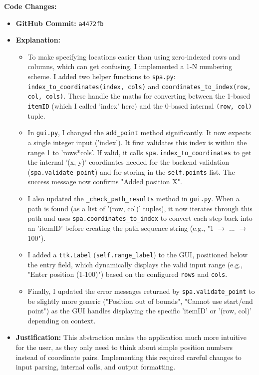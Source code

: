 \textbf{Code Changes:}
\begin{itemize}
	\item \textbf{GitHub Commit:} \verb|a4472fb|
	\item \textbf{Explanation:}
	\begin{itemize}
		\item To make specifying locations easier than using zero-indexed rows and columns, which can get confusing, I implemented a 1-N numbering scheme. I added two helper functions to \verb|spa.py|: \verb|index_to_coordinates(index, cols)| and \verb|coordinates_to_index(row, col, cols)|. These handle the maths for converting between the 1-based \verb|itemID| (which I called 'index' here) and the 0-based internal \verb|(row, col)| tuple.
		\item In \verb|gui.py|, I changed the \verb|add_point| method significantly. It now expects a single integer input ('index'). It first validates this index is within the range 1 to 'rows*cols'. If valid, it calls \verb|spa.index_to_coordinates| to get the internal '(x, y)' coordinates needed for the backend validation (\verb|spa.validate_point|) and for storing in the \verb|self.points| list. The success message now confirms "Added position X".
		\item I also updated the \verb|_check_path_results| method in \verb|gui.py|. When a path is found (as a list of '(row, col)' tuples), it now iterates through this path and uses \verb|spa.coordinates_to_index| to convert each step back into an 'itemID' before creating the path sequence string (e.g., "1 $ \rightarrow $ ... $ \rightarrow $ 100").
		\item I added a \verb|ttk.Label| (\verb|self.range_label|) to the GUI, positioned below the entry field, which dynamically displays the valid input range (e.g., "Enter position (1-100)") based on the configured \verb|rows| and \verb|cols|.
		\item Finally, I updated the error messages returned by \verb|spa.validate_point| to be slightly more generic ("Position out of bounds", "Cannot use start/end point") as the GUI handles displaying the specific 'itemID' or '(row, col)' depending on context.
	\end{itemize}
	\item \textbf{Justification:} This abstraction makes the application much more intuitive for the user, as they only need to think about simple position numbers instead of coordinate pairs. Implementing this required careful changes to input parsing, internal calls, and output formatting.
\end{itemize}

